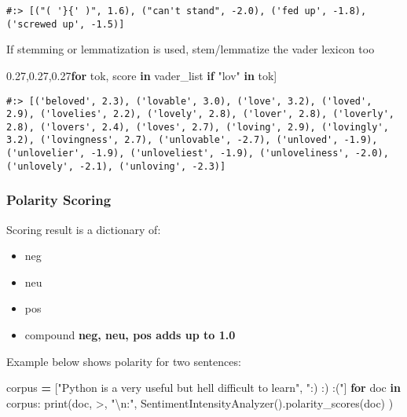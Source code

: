 \documentclass[
]{book}
\newenvironment{Shaded}{\begin{snugshade}}{\end{snugshade}}
\newcommand{\BuiltInTok}[1]{#1}
\newcommand{\CharTok}[1]{\textcolor[rgb]{0.5,0.5,0.5}{#1}}
\newcommand{\ControlFlowTok}[1]{\textcolor[rgb]{0.27,0.27,0.27}{\textbf{#1}}}
\newcommand{\KeywordTok}[1]{\textcolor[rgb]{0.27,0.27,0.27}{\textbf{#1}}}
\newcommand{\NormalTok}[1]{#1}
\newcommand{\OperatorTok}[1]{\textcolor[rgb]{0.43,0.43,0.43}{\textbf{#1}}}
\newcommand{\StringTok}[1]{\textcolor[rgb]{0.5,0.5,0.5}{#1}}
\providecommand{\tightlist}{%
  \setlength{\itemsep}{0pt}\setlength{\parskip}{0pt}}
\begin{document}
\begin{verbatim}
#:> [("( '}{' )", 1.6), ("can't stand", -2.0), ('fed up', -1.8), ('screwed up', -1.5)]
\end{verbatim}

If stemming or lemmatization is used, stem/lemmatize the vader lexicon too

\begin{Shaded}
\begin{Highlighting}[]
\NormalTok{[ (tok,score) }\ControlFlowTok{for}\NormalTok{ tok, score }\KeywordTok{in}\NormalTok{ vader\_list }\ControlFlowTok{if} \StringTok{"lov"} \KeywordTok{in}\NormalTok{ tok]}
\end{Highlighting}
\end{Shaded}

\begin{verbatim}
#:> [('beloved', 2.3), ('lovable', 3.0), ('love', 3.2), ('loved', 2.9), ('lovelies', 2.2), ('lovely', 2.8), ('lover', 2.8), ('loverly', 2.8), ('lovers', 2.4), ('loves', 2.7), ('loving', 2.9), ('lovingly', 3.2), ('lovingness', 2.7), ('unlovable', -2.7), ('unloved', -1.9), ('unlovelier', -1.9), ('unloveliest', -1.9), ('unloveliness', -2.0), ('unlovely', -2.1), ('unloving', -2.3)]
\end{verbatim}

\hypertarget{polarity-scoring}{%
\subsubsection{Polarity Scoring}\label{polarity-scoring}}

Scoring result is a dictionary of:

\begin{itemize}
\tightlist
\item
  neg
\item
  neu
\item
  pos
\item
  compound \textbf{neg, neu, pos adds up to 1.0}
\end{itemize}

Example below shows polarity for two sentences:

\begin{Shaded}
\begin{Highlighting}[]
\NormalTok{corpus }\OperatorTok{=}\NormalTok{ [}\StringTok{"Python is a very useful but hell difficult to learn"}\NormalTok{,}
        \StringTok{":) :) :("}\NormalTok{]}
\ControlFlowTok{for}\NormalTok{ doc }\KeywordTok{in}\NormalTok{ corpus:}
  \BuiltInTok{print}\NormalTok{(doc, }\StringTok{\textquotesingle{}{-}{-}\textgreater{}\textquotesingle{}}\NormalTok{, }\StringTok{"}\CharTok{\textbackslash{}n}\StringTok{:"}\NormalTok{, SentimentIntensityAnalyzer().polarity\_scores(doc) )}
\end{Highlighting}
\end{Shaded}
\end{document}
